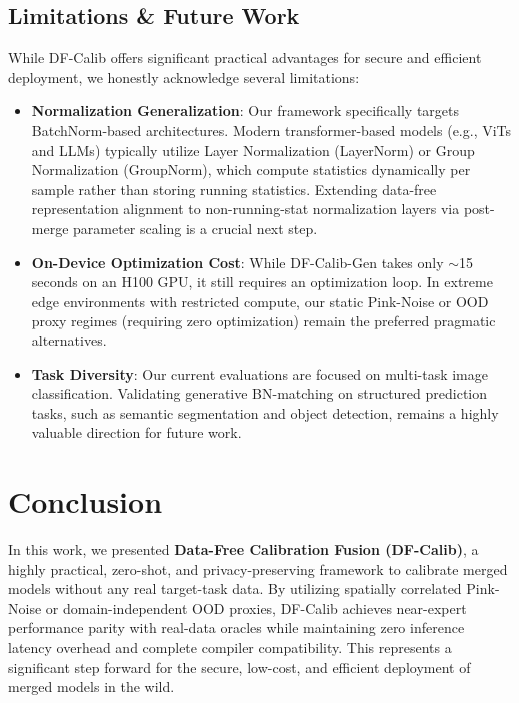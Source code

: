 \documentclass{article}
\theoremstyle{plain}
\theoremstyle{definition}
\theoremstyle{remark}
\begin{document}
\subsection{Limitations \& Future Work}
While DF-Calib offers significant practical advantages for secure and efficient deployment, we honestly acknowledge several limitations:
\begin{itemize}
  \item \textbf{Normalization Generalization}: Our framework specifically targets BatchNorm-based architectures. Modern transformer-based models (e.g., ViTs and LLMs) typically utilize Layer Normalization (LayerNorm) or Group Normalization (GroupNorm), which compute statistics dynamically per sample rather than storing running statistics. Extending data-free representation alignment to non-running-stat normalization layers via post-merge parameter scaling is a crucial next step.
  \item \textbf{On-Device Optimization Cost}: While DF-Calib-Gen takes only $\sim$15 seconds on an H100 GPU, it still requires an optimization loop. In extreme edge environments with restricted compute, our static Pink-Noise or OOD proxy regimes (requiring zero optimization) remain the preferred pragmatic alternatives.
  \item \textbf{Task Diversity}: Our current evaluations are focused on multi-task image classification. Validating generative BN-matching on structured prediction tasks, such as semantic segmentation and object detection, remains a highly valuable direction for future work.
\end{itemize}

\section{Conclusion}
In this work, we presented \textbf{Data-Free Calibration Fusion (DF-Calib)}, a highly practical, zero-shot, and privacy-preserving framework to calibrate merged models without any real target-task data. By utilizing spatially correlated Pink-Noise or domain-independent OOD proxies, DF-Calib achieves near-expert performance parity with real-data oracles while maintaining zero inference latency overhead and complete compiler compatibility. This represents a significant step forward for the secure, low-cost, and efficient deployment of merged models in the wild.



\end{document}
